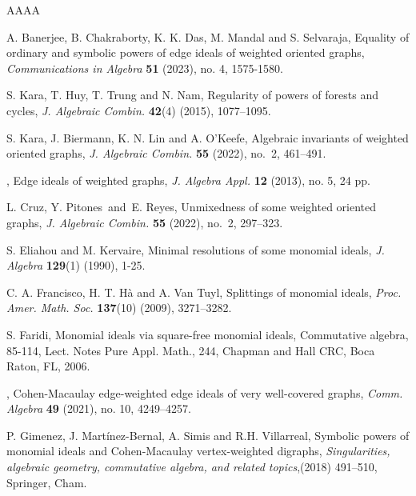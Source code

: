 \documentclass[11pt,reqno]{amsart}
\theoremstyle{definition}
\begin{document}
\begin{thebibliography}{AAAA}

{A. Banerjee, B. Chakraborty, K. K. Das, M. Mandal and S. Selvaraja}, { Equality of ordinary and symbolic powers of edge ideals of weighted oriented graphs},   \textit{Communications in Algebra}   {\bf51} (2023), no. 4,  1575-1580.

{S. Kara, T. Huy, T. Trung and N. Nam}, { Regularity of powers of forests and cycles}, \textit{J. Algebraic Combin.} {\bf42}(4) (2015), 1077–1095.


 S. Kara, J. Biermann, K. N. Lin and A. O'Keefe, { Algebraic invariants of weighted oriented graphs}, \textit{J. Algebraic Combin.} {\bf 55} (2022), no.~2, 461--491.

 , { Edge ideals of weighted graphs}, \textit{J. Algebra Appl.} {\bf 12} (2013), no. 5, 24 pp.





 L. Cruz, Y. Pitones\ and\ E. Reyes, { Unmixedness of some weighted oriented graphs}, \textit{J. Algebraic Combin.} {\bf 55} (2022), no.~2, 297--323.

{S. Eliahou and M. Kervaire}, { Minimal resolutions of some monomial ideals}, \textit{J. Algebra} {\bf129}(1)
(1990), 1-25.
	




	
{C. A. Francisco, H. T. H{\`a} and A. Van Tuyl}, { Splittings of monomial ideals}, \textit{Proc. Amer. Math. Soc.}   {\bf137}(10) (2009), 3271–3282.

 S. Faridi, { Monomial ideals via square-free monomial ideals}, Commutative algebra, 85-114, Lect. Notes Pure Appl. Math., 244, Chapman and Hall CRC, Boca Raton, FL, 2006.

,
{ Cohen-Macaulay edge-weighted edge ideals of very well-covered graphs}, 
\textit{Comm. Algebra} {\bf 49} (2021), no. 10, 4249–4257.

 P. Gimenez, J. Mart\'{i}nez-Bernal, A. Simis and R.H. Villarreal, { Symbolic powers of monomial ideals and Cohen-Macaulay vertex-weighted digraphs},  {\it Singularities, algebraic geometry, commutative algebra, and related topics},(2018) 491--510, Springer, Cham.









\end{thebibliography}
\end{document}

